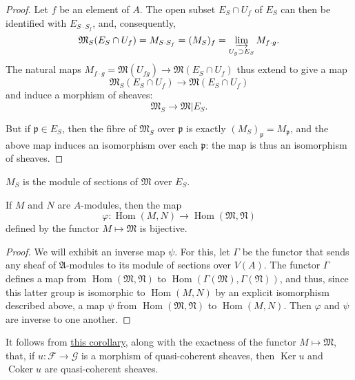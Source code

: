 \documentclass{article}
\theoremstyle{plain}
\newenvironment{corollary}[1]
    {\renewcommand\theinnercustomcorollary{#1}\innercustomcorollary}
    {\endinnercustomcorollary}
\theoremstyle{definition}
\newcommand{\sh}{\mathscr}
\DeclareMathOperator{\Hom}{Hom}
\DeclareMathOperator{\Ker}{Ker}
\DeclareMathOperator{\Coker}{Coker}
\newcommand{\oldpage}[1]{\marginpar{\footnotesize$\Big\vert$ \textit{p.~#1}}}
\begin{document}
\begin{proof}
  Let $f$ be an element of $A$.
  The open subset $E_S\cap U_f$ of $E_S$ can then be identified with $E_{S\cdot S_f}$, and, consequently,
  \[
    \mathfrak{M}_S(E_S\cap U_f)
    = M_{S\cdot S_f}
    = (M_S)_f
    = \varinjlim_{U_g\supset E_S}M_{f\cdot g}.
  \]
  The natural maps $M_{f\cdot g}=\mathfrak{M}(U_{fg})\to\mathfrak{M}(E_S\cap U_f)$ thus extend to give a map
  \[
    \mathfrak{M}_S(E_S\cap U_f) \to \mathfrak{M}(E_S\cap U_f)
  \]
  and induce a morphism of sheaves:
  \[
    \mathfrak{M}_S \to \mathfrak{M}|E_S.
  \]

  But if $\mathfrak{p}\in E_S$, then the fibre of $\mathfrak{M}_S$ over $\mathfrak{p}$ is exactly $(M_S)_\mathfrak{p}=M_\mathfrak{p}$, and the above map induces an isomorphism over each $\mathfrak{p}$:
  the map is thus an isomorphism of sheaves.
\end{proof}

\oldpage{1-07}
\begin{corollary}{2}
\label{corollary2}
  $M_S$ is the module of sections of $\mathfrak{M}$ over $E_S$.
\end{corollary}

\begin{corollary}{3}
\label{corollary3}
  If $M$ and $N$ are $A$-modules, then the map \[\varphi\colon\Hom(M,N)\to\Hom(\mathfrak{M},\mathfrak{N})\] defined by the functor $M\mapsto\mathfrak{M}$ is bijective.
\end{corollary}

\begin{proof}
  We will exhibit an inverse map $\psi$.
  For this, let $\Gamma$ be the functor that sends any sheaf of $\mathfrak{A}$-modules to its module of sections over $V(A)$.
  The functor $\Gamma$ defines a map from $\Hom(\mathfrak{M},\mathfrak{N})$ to $\Hom(\Gamma(\mathfrak{M}),\Gamma(\mathfrak{N}))$, and thus, since this latter group is isomorphic to $\Hom(M,N)$ by an explicit isomorphism described above, a map $\psi$ from $\Hom(\mathfrak{M},\mathfrak{N})$ to $\Hom(M,N)$.
  Then $\varphi$ and $\psi$ are inverse to one another.
\end{proof}

It follows from \hyperref[corollary3]{this corollary}, along with the exactness of the functor $M\mapsto\mathfrak{M}$, that, if $u\colon\sh{F}\to\sh{G}$ is a morphism of quasi-coherent sheaves, then $\Ker u$ and $\Coker u$ are quasi-coherent sheaves.
\end{document}
